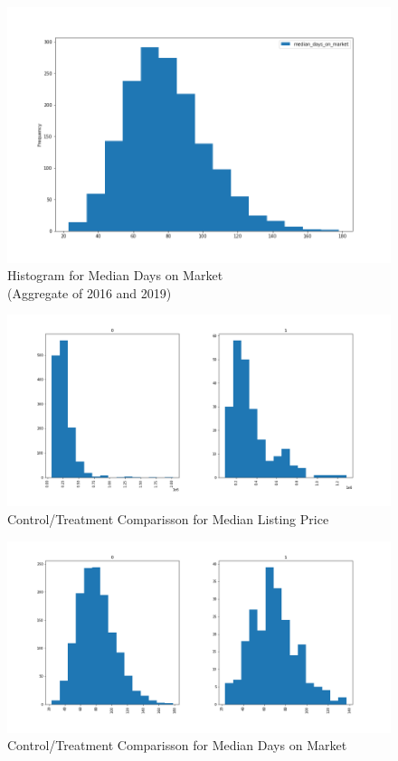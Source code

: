 \begin{figure}[h]
    \centering
    \includegraphics[width=.6\linewidth]{../data_and_processing/media/days_on_mkt_hist.png}
    \caption{Histogram for Median Days on Market \\ (Aggregate of 2016 and 2019)}
    \label{days_on_mkt_hist}
\end{figure}

\begin{figure}[h]
    \centering
    \includegraphics[width=.8\linewidth]{../data_and_processing/media/lst_prc_hist_comp.png}
    \caption{Control/Treatment Comparisson for Median Listing Price}
    \label{lst_prc_hist_comp}
\end{figure}

\begin{figure}[h]
    \centering
    \includegraphics[width=.8\linewidth]{../data_and_processing/media/days_on_mkt_hist_comp.png}
    \caption{Control/Treatment Comparisson for Median Days on Market}
    \label{days_on_mkt_hist_comp}
\end{figure}

